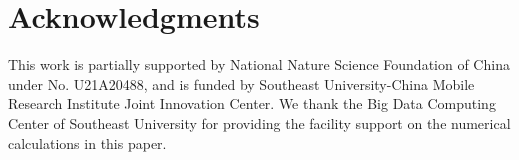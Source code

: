 \documentclass[runningheads]{llncs}
\begin{document}












\section{Acknowledgments}
This work is partially supported by National Nature Science Foundation of China under No. U21A20488, and is funded by Southeast University-China Mobile Research Institute Joint Innovation Center. We thank the Big Data Computing Center of Southeast University for providing the facility support on the numerical calculations in this paper.

%
%
%


%
\end{document}
